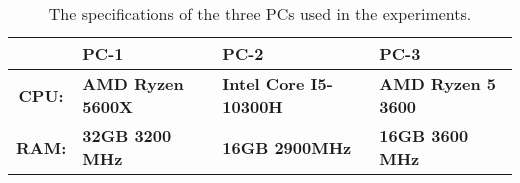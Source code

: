 \begin{table}[htb!]
    \centering
    \begin{tabular}{cp{}p{}p{}}
        \toprule
        \textbf{} & \textbf{PC-1} & \textbf{PC-2} & \textbf{PC-3} \\
        \midrule
        \textbf{CPU:} & \textbf{AMD Ryzen 5600X} & \textbf{Intel Core I5-10300H} & \textbf{AMD Ryzen 5 3600} \\
        \textbf{RAM:} & \textbf{32GB 3200 MHz} & \textbf{16GB 2900MHz} & \textbf{16GB 3600 MHz} \\
        \bottomrule
    \end{tabular}
    \caption{The specifications of the three PCs used in the experiments.}
    \label{tab:pc_specs}
\end{table}